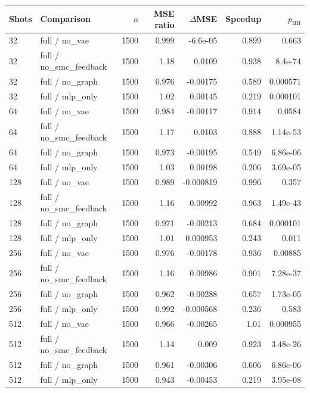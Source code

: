 \begin{tabular}{llrrrrr}
\toprule
Shots & Comparison & $n$ & MSE ratio & $\Delta$MSE & Speedup & $p_{\mathrm{BH}}$ \\
\midrule
32 & full / no\_vae & 1500 & 0.999 & -6.6e-05 & 0.899 & 0.663 \\
32 & full / no\_smc\_feedback & 1500 & 1.18 & 0.0109 & 0.938 & 8.4e-74 \\
32 & full / no\_graph & 1500 & 0.976 & -0.00175 & 0.589 & 0.000571 \\
32 & full / mlp\_only & 1500 & 1.02 & 0.00145 & 0.219 & 0.000101 \\
64 & full / no\_vae & 1500 & 0.984 & -0.00117 & 0.914 & 0.0584 \\
64 & full / no\_smc\_feedback & 1500 & 1.17 & 0.0103 & 0.888 & 1.14e-53 \\
64 & full / no\_graph & 1500 & 0.973 & -0.00195 & 0.549 & 6.86e-06 \\
64 & full / mlp\_only & 1500 & 1.03 & 0.00198 & 0.206 & 3.69e-05 \\
128 & full / no\_vae & 1500 & 0.989 & -0.000819 & 0.996 & 0.357 \\
128 & full / no\_smc\_feedback & 1500 & 1.16 & 0.00992 & 0.963 & 1.49e-43 \\
128 & full / no\_graph & 1500 & 0.971 & -0.00213 & 0.684 & 0.000101 \\
128 & full / mlp\_only & 1500 & 1.01 & 0.000953 & 0.243 & 0.011 \\
256 & full / no\_vae & 1500 & 0.976 & -0.00178 & 0.936 & 0.00885 \\
256 & full / no\_smc\_feedback & 1500 & 1.16 & 0.00986 & 0.901 & 7.28e-37 \\
256 & full / no\_graph & 1500 & 0.962 & -0.00288 & 0.657 & 1.73e-05 \\
256 & full / mlp\_only & 1500 & 0.992 & -0.000568 & 0.236 & 0.583 \\
512 & full / no\_vae & 1500 & 0.966 & -0.00265 & 1.01 & 0.000955 \\
512 & full / no\_smc\_feedback & 1500 & 1.14 & 0.009 & 0.923 & 3.48e-26 \\
512 & full / no\_graph & 1500 & 0.961 & -0.00306 & 0.606 & 6.86e-06 \\
512 & full / mlp\_only & 1500 & 0.943 & -0.00453 & 0.219 & 3.95e-08 \\
\bottomrule
\end{tabular}
